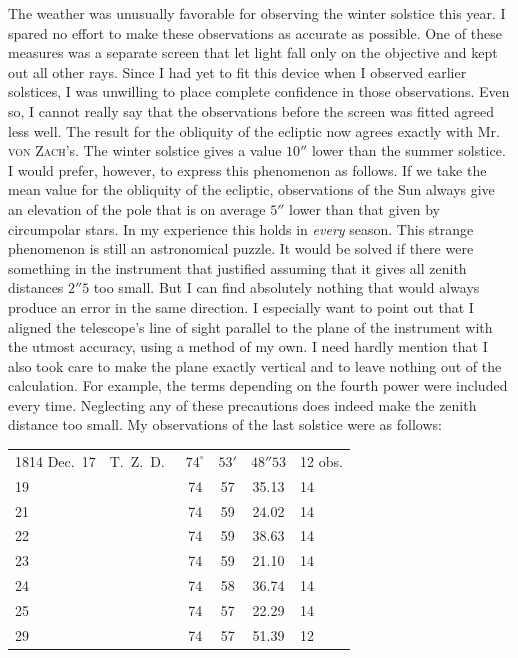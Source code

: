 \par\indent The weather was unusually favorable for observing the winter solstice this year. I spared no effort to make these observations as accurate as possible. One of these measures was a separate screen that let light fall only on the objective and kept out all other rays. Since I had yet to fit this device when I observed earlier solstices, I was unwilling to place complete confidence in those observations. Even so, I cannot really say that the observations before the screen was fitted agreed less well. The result for the obliquity of the ecliptic now agrees exactly with Mr. \textsc{von Zach}’s. The winter solstice gives a value $10''$ lower than the summer solstice. I would prefer, however, to express this phenomenon as follows. If we take the mean value for the obliquity of the ecliptic, observations of the Sun always give an elevation of the pole that is on average $5''$ lower than that given by circumpolar stars. In my experience this holds in \emph{every} season. This strange phenomenon is still an astronomical puzzle. It would be solved if there were something in the instrument that justified assuming that it gives all zenith distances $2''5$ too small. But I can find absolutely nothing that would always produce an error in the same direction. I especially want to point out that I aligned the telescope’s line of sight parallel to the plane of the instrument with the utmost accuracy, using a method of my own. I need hardly mention that I also took care to make the plane exactly vertical and to leave nothing out of the calculation. For example, the terms depending on the fourth power were included every time. Neglecting any of these precautions does indeed make the zenith distance too small. My observations of the last solstice were as follows:

\begin{center}
\fontsize{10}{12}\selectfont\setlength{\tabcolsep}{5pt}\renewcommand{\arraystretch}{1.15}\begin{tabular}{l l ccc l}
1814 Dec.\ 17 & T.\ Z.\ D.\ & $74^\circ$ & $53'$ & $48''53$ & 12 obs. \\
19 & & 74 & 57 & 35.13 & 14 \\
21 & & 74 & 59 & 24.02 & 14 \\
22 & & 74 & 59 & 38.63 & 14 \\
23 & & 74 & 59 & 21.10 & 14 \\
24 & & 74 & 58 & 36.74 & 14 \\
25 & & 74 & 57 & 22.29 & 14 \\
29 & & 74 & 57 & 51.39 & 12 \\
\end{tabular}
\end{center}


